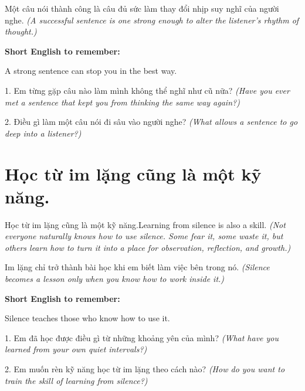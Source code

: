 \begin{baihoc}
Một câu nói thành công là câu đủ sức làm thay đổi nhịp suy nghĩ của người nghe.
\textit{(A successful sentence is one strong enough to alter the listener's rhythm of thought.)}
\end{baihoc}

\begin{ghinhoanh}
\textbf{Short English to remember:}

A strong sentence can stop you in the best way.

\end{ghinhoanh}

\begin{tuhocnhanh}
1. Em từng gặp câu nào làm mình không thể nghĩ như cũ nữa? \textit{(Have you ever met a sentence that kept you from thinking the same way again?)}

2. Điều gì làm một câu nói đi sâu vào người nghe? \textit{(What allows a sentence to go deep into a listener?)}
\end{tuhocnhanh}
\ngancach


\section{Học từ im lặng cũng là một kỹ năng.}
\begin{truyen}{Học từ im lặng cũng là một kỹ năng.}{Learning from silence is also a skill.}
\textit{(Not everyone naturally knows how to use silence. Some fear it, some waste it, but others learn how to turn it into a place for observation, reflection, and growth.)}
\end{truyen}

\begin{baihoc}
Im lặng chỉ trở thành bài học khi em biết làm việc bên trong nó.
\textit{(Silence becomes a lesson only when you know how to work inside it.)}
\end{baihoc}

\begin{ghinhoanh}
\textbf{Short English to remember:}

Silence teaches those who know how to use it.

\end{ghinhoanh}

\begin{tuhocnhanh}
1. Em đã học được điều gì từ những khoảng yên của mình? \textit{(What have you learned from your own quiet intervals?)}

2. Em muốn rèn kỹ năng học từ im lặng theo cách nào? \textit{(How do you want to train the skill of learning from silence?)}
\end{tuhocnhanh}
\ngancach
